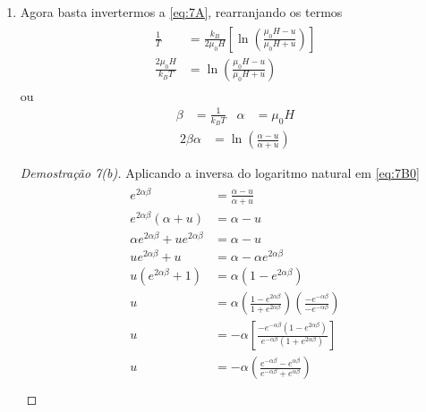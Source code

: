 \begin{prob}
\begin{sol}
\begin{enumerate}[label=\alph *)]
\begin{proof}[Demostração 7(a)]
\begin{align}
\begin{split}
						\Bigg. \Bigg]\\
						\frac{1}{T}=\frac{k_B}{2\mu_0H}\Bigg[&\ln\left(1-\frac{u}{\mu_0H}\right)-\ln\left(1+\frac{u}{\mu_0H}\right)\cancel{+1-1} \Bigg]\\
						\frac{1}{T}=\frac{k_B}{2\mu_0H}\Bigg[&\ln\left(\frac{\mu_0H-u}{\mu_0H+u}\right)\Bigg]
					\end{split}
				\end{align}
			\end{proof}
			\item Agora basta invertermos a \eqref{eq:7A}, rearranjando os termos
			\begin{align}				
				\begin{split}
						\frac{1}{T}&=\frac{k_B}{2\mu_0H}\left[\ln\left(\frac{\mu_0H-u}{\mu_0H+u}\right)\right]\\
						\frac{2\mu_0H}{k_BT}&=\ln\left(\frac{\mu_0H-u}{\mu_0H+u}\right)
				\end{split}
			\end{align}
			ou
			\begin{align}				
				\beta&=\frac{1}{k_BT} & \alpha&=\mu_0H				
			\end{align}
			\begin{align}
				\label{eq:7B0}
				2\beta\alpha&=\ln\left(\frac{\alpha-u}{\alpha+u}\right)
			\end{align}
			\begin{proof}[Demostração 7(b)]
				Aplicando a inversa do logaritmo natural em \eqref{eq:7B0} 
				\begin{align}
					\label{eq:7B}
					\begin{split}
						e^{2\alpha\beta}&=\frac{\alpha-u}{\alpha+u}\\
						e^{2\alpha\beta}\left(\alpha+u\right)&=\alpha-u\\
						\alpha e^{2\alpha\beta}+ue^{2\alpha\beta}&=\alpha-u\\
						ue^{2\alpha\beta}+u&=\alpha-\alpha e^{2\alpha\beta}\\
						u\left(e^{2\alpha\beta}+1\right)&=\alpha\left(1-e^{2\alpha\beta}\right)\\
						u&=\alpha\left(\frac{1-e^{2\alpha\beta}}{1+e^{2\alpha\beta}}\right)\left(\frac{-e^{-\alpha\beta}}{-e^{-\alpha\beta}}\right)\\
						u&=-\alpha\left[\frac{-e^{-\alpha\beta}\left(1-e^{2\alpha\beta}\right)}{e^{-\alpha\beta}\left(1+e^{2\alpha\beta}\right)}\right]\\
						u&=-\alpha\left(\frac{e^{-\alpha\beta}-e^{\alpha\beta}}{e^{-\alpha\beta}+e^{\alpha\beta}}\right)\\

\end{split}
\end{align}
\end{proof}
\end{enumerate}
\end{sol}
\end{prob}
